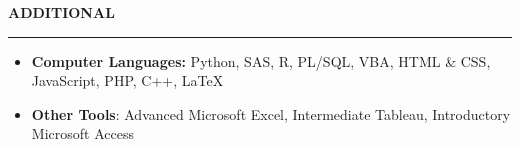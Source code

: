 \documentclass[11pt,letterpaper]{article}
\newcommand{\sectline}{\vspace{4pt}\hrule height 1.5pt\vspace{4pt}}
\begin{document}
\textbf{ADDITIONAL}\sectline
\begin{itemize}
	\item \textbf{Computer Languages:} Python, SAS, R, PL/SQL, VBA, HTML \& CSS, JavaScript, PHP, C++, \LaTeX
	\item \textbf{Other Tools}: Advanced Microsoft Excel, Intermediate Tableau, Introductory Microsoft Access
\end{itemize}
\end{document}
